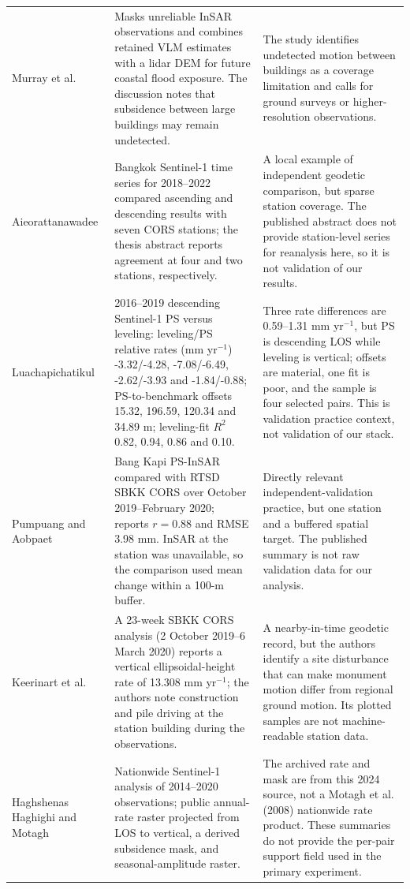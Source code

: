 \documentclass[10pt,a4paper]{article}
\begin{document}
\begin{longtable}{p{.24\linewidth}p{.38\linewidth}p{.3\linewidth}}
Murray et al. \citep{murray2025hawaii} & Masks unreliable InSAR observations and combines retained VLM estimates with a lidar DEM for future coastal flood exposure. The discussion notes that subsidence between large buildings may remain undetected. & The study identifies undetected motion between buildings as a coverage limitation and calls for ground surveys or higher-resolution observations.\\
Aieorattanawadee \citep{aieorattanawadee2022bangkok} & Bangkok Sentinel-1 time series for 2018--2022 compared ascending and descending results with seven CORS stations; the thesis abstract reports agreement at four and two stations, respectively. & A local example of independent geodetic comparison, but sparse station coverage. The published abstract does not provide station-level series for reanalysis here, so it is not validation of our results.\\
Luachapichatikul \citep{luachapichatikul2020bangkok} & 2016--2019 descending Sentinel-1 PS versus leveling: leveling/PS relative rates (mm yr$^{-1}$) -3.32/-4.28, -7.08/-6.49, -2.62/-3.93 and -1.84/-0.88; PS-to-benchmark offsets 15.32, 196.59, 120.34 and 34.89 m; leveling-fit $R^2$ 0.82, 0.94, 0.86 and 0.10. & Three rate differences are 0.59--1.31 mm yr$^{-1}$, but PS is descending LOS while leveling is vertical; offsets are material, one fit is poor, and the sample is four selected pairs. This is validation practice context, not validation of our stack.\\
Pumpuang and Aobpaet \citep{pumpuang2024bangkapi} & Bang Kapi PS-InSAR compared with RTSD SBKK CORS over October 2019--February 2020; reports $r=0.88$ and RMSE 3.98 mm. InSAR at the station was unavailable, so the comparison used mean change within a 100-m buffer. & Directly relevant independent-validation practice, but one station and a buffered spatial target. The published summary is not raw validation data for our analysis.\\
Keerinart et al. \citep{keerinart2020sbkk} & A 23-week SBKK CORS analysis (2 October 2019--6 March 2020) reports a vertical ellipsoidal-height rate of 13.308 mm yr$^{-1}$; the authors note construction and pile driving at the station building during the observations. & A nearby-in-time geodetic record, but the authors identify a site disturbance that can make monument motion differ from regional ground motion. Its plotted samples are not machine-readable station data.\\
Haghshenas Haghighi and Motagh \citep{haghshenas2024iran} & Nationwide Sentinel-1 analysis of 2014--2020 observations; public annual-rate raster projected from LOS to vertical, a derived subsidence mask, and seasonal-amplitude raster. & The archived rate and mask are from this 2024 source, not a Motagh et al. (2008) nationwide rate product. These summaries do not provide the per-pair support field used in the primary experiment.\\

\end{longtable}
\end{document}
